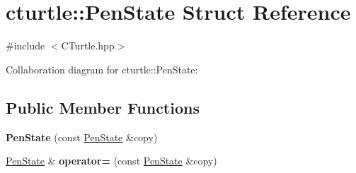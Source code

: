 \hypertarget{structcturtle_1_1PenState}{}\section{cturtle\+:\+:Pen\+State Struct Reference}
\label{structcturtle_1_1PenState}


{\ttfamily \#include $<$C\+Turtle.\+hpp$>$}



Collaboration diagram for cturtle\+:\+:Pen\+State\+:
\subsection*{Public Member Functions}
\begin{DoxyCompactItemize}
\item 
\mbox{\label{structcturtle_1_1PenState_a308973ed85eee69acd4f98b72e2be21c}} 
{\bfseries Pen\+State} (const \hyperlink{structcturtle_1_1PenState}{Pen\+State} \&copy)
\item 
\mbox{\label{structcturtle_1_1PenState_aa324f2f3a6cc360d8d927e677c6b6d1a}} 
\hyperlink{structcturtle_1_1PenState}{Pen\+State} \& {\bfseries operator=} (const \hyperlink{structcturtle_1_1PenState}{Pen\+State} \&copy)
\end{DoxyCompactItemize}
